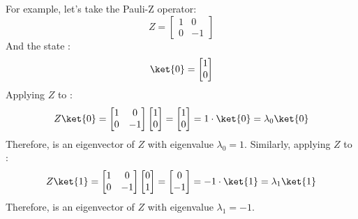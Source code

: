 \begin{enumerate}
\begin{remarkbox}
        \begin{examplebox}
            For example, let's take the Pauli-Z operator:
            \begin{equation*}
                Z =
                \begin{bmatrix}
                    1 & 0 \\
                    0 & -1
                \end{bmatrix}
            \end{equation*}
            And the state :
            \begin{equation*}
                \ket{0} =
                \begin{bmatrix}
                    1 \\
                    0
                \end{bmatrix}
            \end{equation*}
            Applying $Z$ to :
            \begin{equation*}
                Z\ket{0} =
                \begin{bmatrix}
                    1 & 0 \\
                    0 & -1
                \end{bmatrix}
                \begin{bmatrix}
                    1 \\
                    0
                \end{bmatrix}
                =
                \begin{bmatrix}
                    1 \\
                    0
                \end{bmatrix}
                =
                1 \cdot \ket{0}
                =
                \lambda_0 \ket{0}
            \end{equation*}
            Therefore,  is an eigenvector of $Z$ with eigenvalue $\lambda_0 = 1$. Similarly, applying $Z$ to :
            \begin{equation*}
                Z\ket{1} =
                \begin{bmatrix}
                    1 & 0 \\
                    0 & -1
                \end{bmatrix}
                \begin{bmatrix}
                    0 \\
                    1
                \end{bmatrix}
                =
                \begin{bmatrix}
                    0 \\
                    -1
                \end{bmatrix}
                =
                -1 \cdot \ket{1}
                =
                \lambda_1 \ket{1}
            \end{equation*}
            Therefore,  is an eigenvector of $Z$ with eigenvalue $\lambda_1 = -1$.
        \end{examplebox}


\end{remarkbox}
\end{enumerate}
